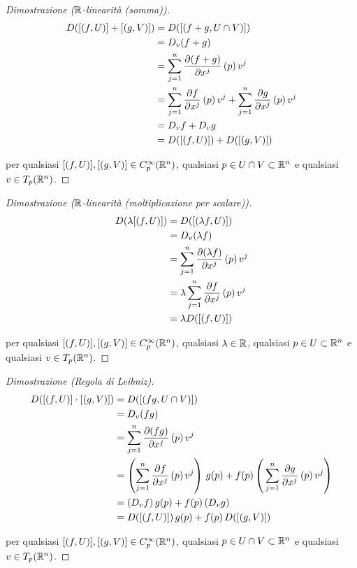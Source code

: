 \begin{proof}[Dimostrazione ($ \mathbb{R} $-linearità (somma))]
	\begin{align}
		\begin{split}
			D ([(f,U)] + [(g,V)]) &= D ([(f+g,U \cap V)]) \\
			&= D_{v} (f+g) \\
			&= \sum_{j=1}^{n} \pdv{(f+g)}{x^{j}} \, (p) \, v^{j} \\
			&= \sum_{j=1}^{n} \pdv{f}{x^{j}} \, (p) \, v^{j} + \sum_{j=1}^{n} \pdv{g}{x^{j}} \, (p) \, v^{j} \\
			&= D_{v} f + D_{v} g \\
			&= D ([(f,U)]) + D ([(g,V)])
		\end{split}
	\end{align}

	per qualsiasi $ [(f,U)], [(g,V)] \in C_{p}^{\infty}(\mathbb{R}^{n}) $, qualsiasi $ p \in U \cap V \subset \mathbb{R}^{n} $ e qualsiasi $ v \in T_{p} (\mathbb{R}^{n}) $.
\end{proof}

\begin{proof}[Dimostrazione ($ \mathbb{R} $-linearità (moltiplicazione per scalare))]
	\begin{align}
		\begin{split}
			D (\lambda [(f,U)]) &= D ([(\lambda f,U)]) \\
			&= D_{v} (\lambda f) \\
			&= \sum_{j=1}^{n} \pdv{(\lambda f)}{x^{j}} \, (p) \, v^{j} \\
			&= \lambda \sum_{j=1}^{n} \pdv{f}{x^{j}} \, (p) \, v^{j} \\
			&= \lambda D ([(f,U)])
		\end{split}
	\end{align}

	per qualsiasi $ [(f,U)], [(g,V)] \in C_{p}^{\infty}(\mathbb{R}^{n}) $, qualsiasi $ \lambda \in \mathbb{R} $, qualsiasi $ p \in U \subset \mathbb{R}^{n} $ e qualsiasi $ v \in T_{p} (\mathbb{R}^{n}) $.
\end{proof}

\begin{proof}[Dimostrazione (Regola di Leibniz)]
	\begin{align}
		\begin{split}
			D ([(f,U)] \cdot [(g,V)]) &= D ([(f g,U \cap V)]) \\
			&= D_{v} (f g) \\
			&= \sum_{j=1}^{n} \pdv{(f g)}{x^{j}} \, (p) \, v^{j} \\
			&= \left( \sum_{j=1}^{n} \pdv{f}{x^{j}} \, (p) \, v^{j} \right) \, g(p) + f(p) \left( \, \sum_{j=1}^{n} \pdv{g}{x^{j}} \, (p) \, v^{j} \right) \\
			&= (D_{v} f) \, g(p) + f(p) \, (D_{v} g) \\
			&= D ([(f,U)]) \, g(p) + f(p) \, D ([(g,V)])
		\end{split}
	\end{align}

	per qualsiasi $ [(f,U)], [(g,V)] \in C_{p}^{\infty}(\mathbb{R}^{n}) $, qualsiasi $ p \in U \cap V \subset \mathbb{R}^{n} $ e qualsiasi $ v \in T_{p} (\mathbb{R}^{n}) $.
\end{proof}

